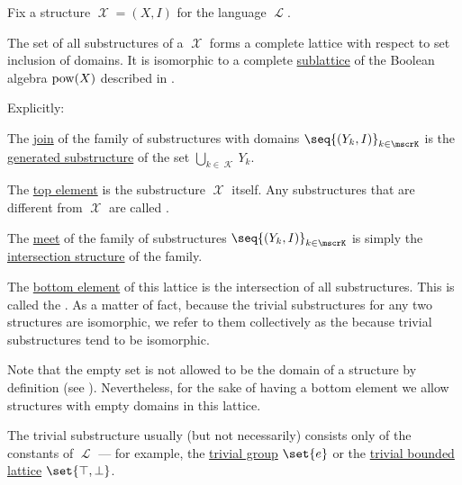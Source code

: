 \begin{proposition}\label{thm:substructures_form_complete_lattice}
  Fix a structure \( \mscrX = (X, I) \) for the language \( \mscrL \).

  The set of all substructures of a \( \mscrX \) forms a complete lattice with respect to set inclusion of domains. It is isomorphic to a complete \hyperref[def:semilattice/submodel]{sublattice} of the Boolean algebra \( \operatorname{pow}(X) \) described in .

  Explicitly:
  \begin{thmenum}
     The \hyperref[def:semilattice/join]{join} of the family of substructures with domains \( \seq{ (Y_k, I) }_{k \in \mscrK} \) is the \hyperref[def:first_order_generated_substructure]{generated substructure} of the set \( \bigcup_{k \in \mscrK} Y_k \).

     The \hyperref[def:poset_extremal_points/top_and_bottom]{top element} is the substructure \( \mscrX \) itself. Any substructures that are different from \( \mscrX \) are called .

     The \hyperref[def:semilattice/meet]{meet} of the family of substructures \( \seq{ (Y_k, I) }_{k \in \mscrK} \) is simply the \hyperref[thm:first_order_substructure_properties/intersection]{intersection structure} of the family.

     The \hyperref[def:poset_extremal_points/top_and_bottom]{bottom element} of this lattice is the intersection of all substructures. This is called the . As a matter of fact, because the trivial substructures for any two structures are isomorphic, we refer to them collectively as the  because trivial substructures tend to be isomorphic.

    Note that the empty set is not allowed to be the domain of a structure by definition (see ). Nevertheless, for the sake of having a bottom element we allow structures with empty domains in this lattice.

    The trivial substructure usually (but not necessarily) consists only of the constants of \( \mscrL \) --- for example, the \hyperref[def:group/trivial]{trivial group} \( \set{ e } \) or the \hyperref[def:semilattice/trivial]{trivial bounded lattice} \( \set{ \top, \bot } \).
  \end{thmenum}
\end{proposition}
